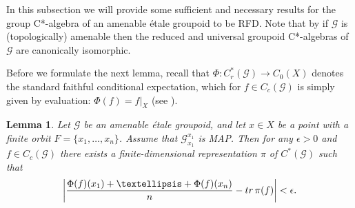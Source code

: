 \documentclass[11 pt, leqno, hidelinks]{amsart}%
\theoremstyle{plain}
\newtheorem{lemma}[theorem]{Lemma}
\numberwithin{equation}{section}
\newcommand{\GG}{\mathcal{G}}
\newcommand{\tr}{\textup{tr}}
\begin{document}
In this subsection we will provide some sufficient and necessary results for the group C*-algebra of an amenable \'etale groupoid to be RFD. Note that by \cite[Proposition 6.1.8]{ADR} if $\GG$ is (topologically) amenable then the reduced and universal groupoid C*-algebras of $\GG$ are canonically isomorphic.

Before we formulate the next lemma, recall that $\Phi:C^*_r(\GG)\to C_0(X)$ denotes the standard faithful conditional expectation, which for $f\in C_c(\GG)$ is simply given by evaluation:
$\Phi(f) = f|_{X}$ (see \cite[Proposition 4.2.6]{Aidan}).





\begin{lemma}\label{mainrevisited} Let $\GG$ be an amenable \'etale groupoid, and let $x\in X$ be a point with a finite orbit  $F = \{x_1, \ldots,x_n\}$. Assume that $\GG_{x_1}^{x_1}$ is MAP.   Then for any $\epsilon>0$ and $f \in C_c(\GG)$ there exists a finite-dimensional representation $\pi$ of $C^*(\GG)$ such that $$\left| \frac{\Phi(f)(x_1)+\ldots +\Phi(f)(x_n)}{n} - \tr \, \pi(f)\right|<\epsilon.$$
\end{lemma}
\end{document}
